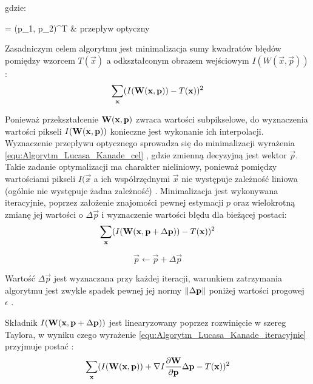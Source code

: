 \noindent
gdzie:

\begin{conditions}
	 = (p_1, p_2)^T & przepływ optyczny \\
\end{conditions}

Zasadniczym celem algorytmu jest minimalizacja sumy kwadratów błędów pomiędzy  wzorcem $T(\vec{x})$ a odkształconym obrazem wejściowym $I(W(\vec{x}, \vec{p}))$ \cite{Baker2004}:
\begin{equation}
\label{equ:Algorytm_Lucasa_Kanade_cel}
	\sum\limits_{\mathbf{x}} (I(\mathbf{W}(\mathbf{x}, \mathbf{p})) - T(\mathbf{x}))^2
\end{equation}

Ponieważ przekształcenie $\mathbf{W}(\mathbf{x}, \mathbf{p})$ zwraca wartości subpikselowe, do wyznaczenia wartości pikseli $I(\mathbf{W}(\mathbf{x}, \mathbf{p}))$ konieczne jest wykonanie ich interpolacji. Wyznaczenie przepływu optycznego sprowadza się do minimalizacji wyrażenia \ref{equ:Algorytm_Lucasa_Kanade_cel} , gdzie zmienną decyzyjną jest wektor $\vec{p}$. Takie zadanie optymalizacji ma charakter nieliniowy, ponieważ pomiędzy wartościami pikseli $I(\vec{x}$ a ich współrzędnymi $\vec{x}$ nie występuje zależność liniowa (ogólnie nie występuje żadna zależność) \cite{Baker2004}. Minimalizacja jest wykonywana iteracyjnie, poprzez założenie znajomości pewnej estymacji $p$ oraz wielokrotną zmianę jej wartości o $\Delta \vec{p}$ i wyznaczenie wartości błędu dla bieżącej postaci:
\begin{equation}
\label{equ:Algorytm_Lucasa_Kanade_iteracyjnie}
	\sum\limits_{\mathbf{x}} (I(\mathbf{W}(\mathbf{x}, \mathbf{p} + \Delta \mathbf{p})) - T(\mathbf{x}))^2
\end{equation}

\begin{equation}
\label{equ:Algorytm_Lucasa_Kanade_podstawienie}
	\vec{p} \gets \vec{p} + \Delta \vec{p}
\end{equation}

Wartość $\Delta \vec{p}$ jest wyznaczana przy każdej iteracji, warunkiem zatrzymania algorytmu jest zwykle spadek pewnej jej normy $\lVert\Delta \mathbf{p}\rVert$ poniżej wartości progowej $\epsilon$ \cite{Baker2004}. 

Składnik $I(\mathbf{W}(\mathbf{x}, \mathbf{p} + \Delta \mathbf{p}))$ jest linearyzowany poprzez rozwinięcie w szereg Taylora, w wyniku czego wyrażenie \ref{equ:Algorytm_Lucasa_Kanade_iteracyjnie} przyjmuje postać \cite{Baker2004}:
\begin{equation}
\label{equ:Algorytm_Lucasa_Kanade_Taylor}
	\sum\limits_{\mathbf{x}} (I(\mathbf{W}(\mathbf{x}, \mathbf{p})) + \nabla I \frac{\partial \mathbf{W}}{\partial \mathbf{p}} \Delta \mathbf{p} - T(\mathbf{x}))^2
\end{equation}

